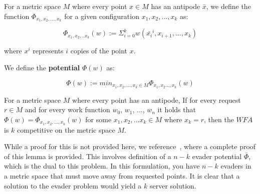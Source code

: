 \begin{definition}
    For a metric space $M$ where every point $x \in M$ has an antipode $\bar{x}$, we define the function \textbf{$\Phi_{x_1, x_2, ..., x_k}$} for a given configuration $x_1, x_2, ..., x_k$ as:

    \begin{equation*}
        \Phi_{x_1, x_2, ..x_k}(w) := \Sigma_{i=0}^k w(\bar{x_i}^i, x_{i+1}, ..., x_k)
    \end{equation*}

    where $x^i$ represents $i$ copies of the point $x$.
\end{definition}

\begin{definition}
    We define the \textbf{potential} $\Phi (w)$ as:

    \begin{equation*}
        \Phi(w) := min_{x_1, x_2, ..., x_k \in M} \Phi_{x_1, x_2..., x_k} (w)
    \end{equation*}
\end{definition}

\begin{lemma}
    For a metric space $M$ where every point has an antipode, If for every request $r \in M$ and for every work function $w_0$, $w_1$, ..., $w_n$ it holds that $\Phi(w) = \Phi_{x_1, x_2, ..., x_k}(w)$ for some $x_1, x_2, ...x_k \in M$ where $x_k = r$, then the $WFA$ is $k$ competitive on the metric space $M$.
\end{lemma}

While a proof for this is not provided here, we reference~\cite{unifyingPotential2021}, where a complete proof of this lemma is provided. This involves definition of a $n-k$ evader potential $\bar{\Phi}$, which is the dual to this problem. In this formulation, you have $n-k$ evaders in a metric space that must move away from requested points. It is clear that a solution to the evader problem would yield a $k$ server solution.